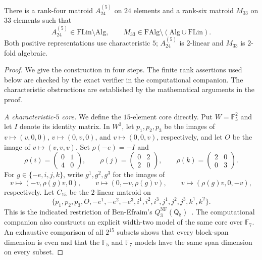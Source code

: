 \documentclass[11pt]{article}
\theoremstyle{definition}
\newcommand{\FAlg}{\mathrm{FAlg}}
\newcommand{\FLin}{\mathrm{FLin}}
\newcommand{\Alg}{\mathrm{Alg}}
\begin{document}
\begin{proposition}\label{prop:m33}
There is a rank-four matroid $A_{24}^{(5)}$ on $24$ elements and a rank-six matroid $M_{33}$ on $33$ elements such that
\[
A_{24}^{(5)}\in\FLin\setminus\Alg,
\qquad
M_{33}\in\FAlg\setminus(\Alg\cup\FLin).
\]
Both positive representations use characteristic $5$; $A_{24}^{(5)}$ is $2$-linear and $M_{33}$ is $2$-fold algebraic.
\end{proposition}
\begin{proof}
We give the construction in four steps.  The finite rank assertions used below are checked by the exact verifier in the computational companion.  The characteristic obstructions are established by the mathematical arguments in the proof.

\emph{A characteristic-$5$ core.}
We define the $15$-element core directly.  Put $W=\mathbb F_5^2$ and let $I$ denote its identity matrix.  In $W^3$, let $p_1,p_2,p_3$ be the images of $v\mapsto(v,0,0)$, $v\mapsto(0,v,0)$, and $v\mapsto(0,0,v)$, respectively, and let $O$ be the image of $v\mapsto(v,v,v)$.  Set $\rho(-e)=-I$ and
\[
\rho(i)=\begin{pmatrix}0&1\\4&0\end{pmatrix},\qquad
\rho(j)=\begin{pmatrix}0&2\\2&0\end{pmatrix},\qquad
\rho(k)=\begin{pmatrix}2&0\\0&3\end{pmatrix}.
\]
For $g\in\{-e,i,j,k\}$, write $g^1,g^2,g^3$ for the images of
\[
v\longmapsto(-v,\rho(g)v,0),\qquad
v\longmapsto(0,-v,\rho(g)v),\qquad
v\longmapsto(\rho(g)v,0,-v),
\]
respectively.  Let $C_{15}$ be the $2$-linear matroid on
\[
\{p_1,p_2,p_3,O,-e^1,-e^2,-e^3,
  i^1,i^2,i^3,j^1,j^2,j^3,k^1,k^2\}.
\]
This is the indicated restriction of Ben-Efraim's $Q^{\mathrm{NF}}_3(\mathsf Q_8)$~\cite{BenEfraim2016}.  The computational companion also constructs an explicit width-two model of the same core over $\mathbb F_7$.  An exhaustive comparison of all $2^{15}$ subsets shows that every block-span dimension is even and that the $\mathbb F_5$ and $\mathbb F_7$ models have the same span dimension on every subset.


\end{proof}
\end{document}
